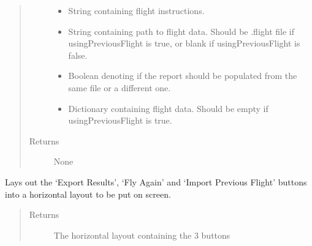 \documentclass[letterpaper,10pt,english]{sphinxmanual}
\begin{document}
\begin{fulllineitems}
\begin{fulllineitems}
\begin{quote}
\begin{description}
\begin{itemize}
\item {} 
 \textendash{} String containing flight instructions.

\item {} 
 \textendash{} String containing path to flight data. Should be .flight file if usingPreviousFlight is true, or blank if usingPreviousFlight is false.

\item {} 
 \textendash{} Boolean denoting if the report should be populated from the same file or a different one.

\item {} 
 \textendash{} Dictionary containing flight data. Should be empty if usingPreviousFlight is true.

\end{itemize}

\item[{Returns}] \leavevmode
None

\end{description}\end{quote}

\end{fulllineitems}


\begin{fulllineitems}
\label{\detokenize{index:src.Views.View_ReportScreen.ReportWindow.setButtonLayout}}
Lays out the ‘Export Results’, ‘Fly Again’ and ‘Import Previous Flight’ buttons into a horizontal layout to be
put on screen.
\begin{quote}\begin{description}
\item[{Returns}] \leavevmode
The horizontal layout containing the 3 buttons

\end{description}\end{quote}

\end{fulllineitems}



\end{fulllineitems}
\end{document}
